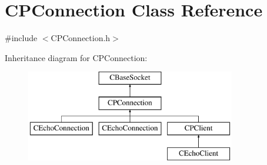 \hypertarget{class_c_p_connection}{\section{\-C\-P\-Connection \-Class \-Reference}
\label{class_c_p_connection}
}


{\ttfamily \#include $<$\-C\-P\-Connection.\-h$>$}

\-Inheritance diagram for \-C\-P\-Connection\-:\begin{figure}[H]
\begin{center}
\leavevmode
\includegraphics[height=4.000000cm]{class_c_p_connection}
\end{center}
\end{figure}
